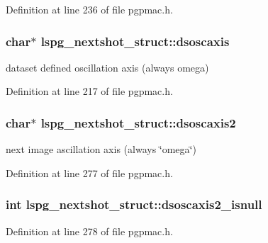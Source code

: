 Definition at line 236 of file pgpmac.\-h.

\hypertarget{structlspg__nextshot__struct_a9a62c304e66013e8e5e5618a44f0b6d4}{
\subsubsection[{dsoscaxis}]{\setlength{\rightskip}{0pt plus 5cm}char$\ast$ lspg\-\_\-nextshot\-\_\-struct\-::dsoscaxis}}\label{structlspg__nextshot__struct_a9a62c304e66013e8e5e5618a44f0b6d4}


dataset defined oscillation axis (always omega) 



Definition at line 217 of file pgpmac.\-h.

\hypertarget{structlspg__nextshot__struct_ac86005a6e90ff502da9e95b59d0b7a5f}{
\subsubsection[{dsoscaxis2}]{\setlength{\rightskip}{0pt plus 5cm}char$\ast$ lspg\-\_\-nextshot\-\_\-struct\-::dsoscaxis2}}\label{structlspg__nextshot__struct_ac86005a6e90ff502da9e95b59d0b7a5f}


next image ascillation axis (always \char`\"{}omega\char`\"{}) 



Definition at line 277 of file pgpmac.\-h.

\hypertarget{structlspg__nextshot__struct_a98e280e99ae847559bb82836df3c32d1}{
\subsubsection[{dsoscaxis2\-\_\-isnull}]{\setlength{\rightskip}{0pt plus 5cm}int lspg\-\_\-nextshot\-\_\-struct\-::dsoscaxis2\-\_\-isnull}}\label{structlspg__nextshot__struct_a98e280e99ae847559bb82836df3c32d1}


Definition at line 278 of file pgpmac.\-h.

